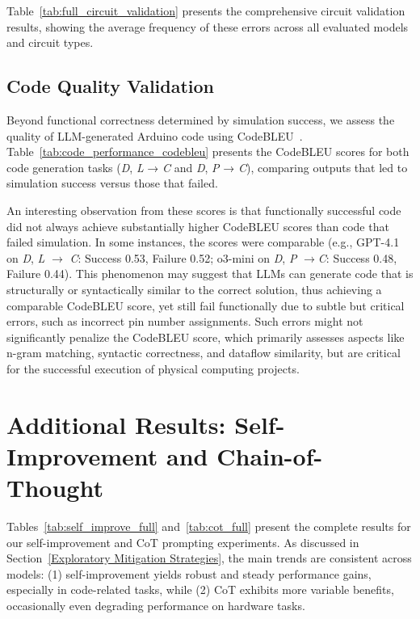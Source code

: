 \documentclass{article} %
\begin{document}
Table~\ref{tab:full_circuit_validation} presents the comprehensive circuit validation results, showing the average frequency of these errors across all evaluated models and circuit types.

\subsection{Code Quality Validation}
Beyond functional correctness determined by simulation success, we assess the quality of LLM-generated Arduino code using CodeBLEU~\citep{ren2020codebleu}. Table~\ref{tab:code_performance_codebleu} presents the CodeBLEU scores for both code generation tasks (\textit{D}, \textit{L} → \textit{C} and \textit{D}, \textit{P} → \textit{C}), comparing outputs that led to simulation success versus those that failed.

An interesting observation from these scores is that functionally successful code did not always achieve substantially higher CodeBLEU scores than code that failed simulation. In some instances, the scores were comparable (e.g., GPT-4.1 on \textit{D}, \textit{L} $\rightarrow$ \textit{C}: Success 0.53, Failure 0.52; o3-mini on \textit{D}, \textit{P} $\rightarrow $\textit{C}: Success 0.48, Failure 0.44).
This phenomenon may suggest that LLMs can generate code that is structurally or syntactically similar to the correct solution, thus achieving a comparable CodeBLEU score, yet still fail functionally due to subtle but critical errors, such as incorrect pin number assignments.
Such errors might not significantly penalize the CodeBLEU score, which primarily assesses aspects like n-gram matching, syntactic correctness, and dataflow similarity, but are critical for the successful execution of physical computing projects.

\section{Additional Results: Self-Improvement and Chain-of-Thought}
\label{Appendix:AddResults}

Tables~\ref{tab:self_improve_full} and~\ref{tab:cot_full} present the complete results for our self-improvement and CoT prompting experiments. 
As discussed in Section~\ref{Exploratory Mitigation Strategies}, the main trends are consistent across models: (1) self-improvement yields robust and steady performance gains, especially in code-related tasks, while (2) CoT exhibits more variable benefits, occasionally even degrading performance on hardware tasks.
\end{document}
